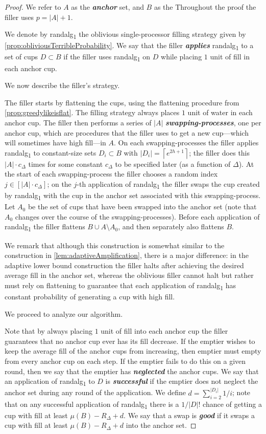 \documentclass[twocolumn]{article}[10pt]
\newcommand{\defn}[1]{{\textit{\textbf{\boldmath #1}}}\xspace}
\newcommand{\randalg}{randalg\textsubscript{1}\xspace}
\newcommand{\ceil}[1]{\left\lceil #1 \right\rceil}
\begin{document}
\begin{proof}
  We refer to $A$ as the \defn{anchor} set, and $B$ as the
  Throughout the proof the filler uses $p=|A|+1$.

We denote by \randalg the oblivious single-processor filling
strategy given by \cref{prop:obliviousTerribleProbability}. We
say that the filler \defn{applies} \randalg to a set of cups $D
\subset B$ if the filler uses \randalg on $D$ while placing $1$
unit of fill in each anchor cup. 

We now describe the filler's strategy.

The filler starts by flattening the cups, using the flattening
procedure from \cref{prop:greedylikeisflat}. The filling strategy
always places $1$ unit of water in each anchor cup. The filler
then performs a series of $|A|$ \defn{swapping-processes}, one
per anchor cup, which are procedures that the filler uses to get
a new cup---which will sometimes have high fill---in $A$. On each
swapping-processes the filler applies \randalg to constant-size
sets $D_i \subset B$ with $|D_i| = \ceil{e^{2h+1}}$; the filler
does this $|A|\cdot c_\Delta$ times for some constant $c_\Delta$
to be specified later (as a function of $\Delta$). At the start
of each swapping-process the filler chooses a random index $j \in
[|A|\cdot c_\Delta]$; on the $j$-th application of \randalg the
filler swaps the cup created by \randalg with the cup in the
anchor set associated with this swapping-process. 
Let $A_0$ be the set of cups that have been swapped into the
anchor set (note that $A_0$ changes over the course of the
swapping-processes). Before each application of \randalg the filler
flattens $B \cup A\setminus A_0$, and then separately also
flattens $B$. 

We remark that although this construction is somewhat similar to
the construction in \cref{lem:adaptiveAmplification}, there is a
major difference: in the adaptive lower bound construction the
filler halts after achieving the desired average fill in the
anchor set, whereas the oblivious filler cannot halt but rather
must rely on flattening to guarantee that each application of
\randalg has constant probability of generating a cup with high
fill.

We proceed to analyze our algorithm.

Note that by always placing $1$ unit of fill into each anchor cup
the filler guarantees that no anchor cup ever has its fill
decrease. If the emptier wishes to keep the
average fill of the anchor cups from increasing, then emptier
must empty from every anchor cup on each step. If the emptier
fails to do this on a given round, then we say that the emptier
has \defn{neglected} the anchor cups. We say that an application
of \randalg to $D$ is \defn{successful} if the emptier does not
neglect the anchor set during any round of the application. We
define $d = \sum_{i=2}^{|D_i|} 1/i$; note that on any successful
application of \randalg there is a $1/|D|!$ chance of getting a
cup with fill at least $\mu(B) -R_\Delta + d$. We say that a swap
is \defn{good} if it swaps a cup with fill at least
$\mu(B)-R_\Delta + d$ into the anchor set.


\end{proof}
\end{document}
